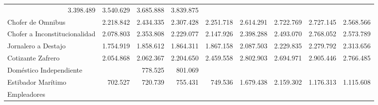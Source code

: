 \begin{tabular}{lllllllll}
  \multicolumn{1}{r}{3.398.489} &
  \multicolumn{1}{r}{3.540.629} &
  \multicolumn{1}{r}{3.685.888} &
  \multicolumn{1}{r}{3.839.875} \\
\multicolumn{1}{l}{\hspace{1em}Chofer de Omnibus} &
  \multicolumn{1}{|r}{2.218.842} &
  \multicolumn{1}{r}{2.434.335} &
  \multicolumn{1}{r}{2.307.428} &
  \multicolumn{1}{r}{2.251.718} &
  \multicolumn{1}{r}{2.614.291} &
  \multicolumn{1}{r}{2.722.769} &
  \multicolumn{1}{r}{2.727.145} &
  \multicolumn{1}{r}{2.568.566} \\
\multicolumn{1}{l}{\hspace{1em}Chofer a Inconstitucionalidad} &
  \multicolumn{1}{|r}{2.078.803} &
  \multicolumn{1}{r}{2.353.808} &
  \multicolumn{1}{r}{2.229.077} &
  \multicolumn{1}{r}{2.147.926} &
  \multicolumn{1}{r}{2.398.288} &
  \multicolumn{1}{r}{2.493.070} &
  \multicolumn{1}{r}{2.768.052} &
  \multicolumn{1}{r}{2.573.789} \\
\multicolumn{1}{l}{\hspace{1em}Jornalero a Destajo} &
  \multicolumn{1}{|r}{1.754.919} &
  \multicolumn{1}{r}{1.858.612} &
  \multicolumn{1}{r}{1.864.311} &
  \multicolumn{1}{r}{1.867.158} &
  \multicolumn{1}{r}{2.087.503} &
  \multicolumn{1}{r}{2.229.835} &
  \multicolumn{1}{r}{2.279.792} &
  \multicolumn{1}{r}{2.313.656} \\
\multicolumn{1}{l}{\hspace{1em}Cotizante Zafrero} &
  \multicolumn{1}{|r}{2.054.868} &
  \multicolumn{1}{r}{2.062.367} &
  \multicolumn{1}{r}{2.204.650} &
  \multicolumn{1}{r}{2.459.558} &
  \multicolumn{1}{r}{2.802.903} &
  \multicolumn{1}{r}{2.694.971} &
  \multicolumn{1}{r}{2.905.446} &
  \multicolumn{1}{r}{2.766.485} \\
\multicolumn{1}{l}{\hspace{1em}Doméstico Independiente} &
  \multicolumn{1}{|r}{} &
  \multicolumn{1}{r}{778.525} &
  \multicolumn{1}{r}{801.069} &
  \multicolumn{1}{r}{} &
  \multicolumn{1}{r}{} &
  \multicolumn{1}{r}{} &
  \multicolumn{1}{r}{} &
  \multicolumn{1}{r}{} \\
\multicolumn{1}{l}{\hspace{1em}Estibador Marítimo} &
  \multicolumn{1}{|r}{702.527} &
  \multicolumn{1}{r}{720.739} &
  \multicolumn{1}{r}{755.431} &
  \multicolumn{1}{r}{749.536} &
  \multicolumn{1}{r}{1.679.438} &
  \multicolumn{1}{r}{2.159.302} &
  \multicolumn{1}{r}{1.176.313} &
  \multicolumn{1}{r}{1.115.608} \\
\multicolumn{1}{l}{\hspace{1em}Empleadores} &

\end{tabular}
